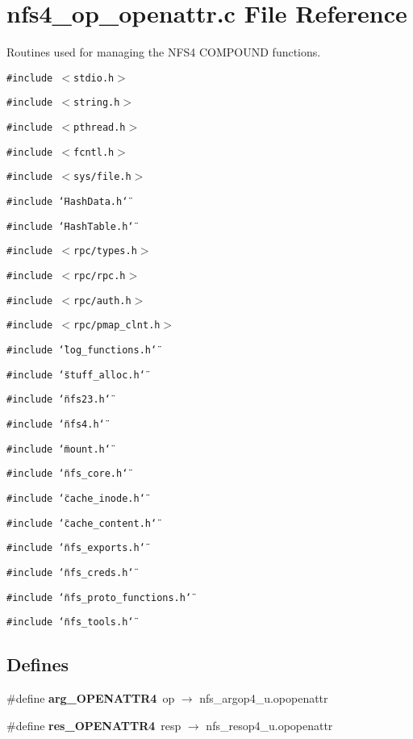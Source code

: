\section{nfs4\_\-op\_\-openattr.c File Reference}
\label{nfs4__op__openattr_8c}
Routines used for managing the NFS4 COMPOUND functions. 

{\tt \#include $<$stdio.h$>$}\par
{\tt \#include $<$string.h$>$}\par
{\tt \#include $<$pthread.h$>$}\par
{\tt \#include $<$fcntl.h$>$}\par
{\tt \#include $<$sys/file.h$>$}\par
{\tt \#include \char`\"{}Hash\-Data.h\char`\"{}}\par
{\tt \#include \char`\"{}Hash\-Table.h\char`\"{}}\par
{\tt \#include $<$rpc/types.h$>$}\par
{\tt \#include $<$rpc/rpc.h$>$}\par
{\tt \#include $<$rpc/auth.h$>$}\par
{\tt \#include $<$rpc/pmap\_\-clnt.h$>$}\par
{\tt \#include \char`\"{}log\_\-functions.h\char`\"{}}\par
{\tt \#include \char`\"{}stuff\_\-alloc.h\char`\"{}}\par
{\tt \#include \char`\"{}nfs23.h\char`\"{}}\par
{\tt \#include \char`\"{}nfs4.h\char`\"{}}\par
{\tt \#include \char`\"{}mount.h\char`\"{}}\par
{\tt \#include \char`\"{}nfs\_\-core.h\char`\"{}}\par
{\tt \#include \char`\"{}cache\_\-inode.h\char`\"{}}\par
{\tt \#include \char`\"{}cache\_\-content.h\char`\"{}}\par
{\tt \#include \char`\"{}nfs\_\-exports.h\char`\"{}}\par
{\tt \#include \char`\"{}nfs\_\-creds.h\char`\"{}}\par
{\tt \#include \char`\"{}nfs\_\-proto\_\-functions.h\char`\"{}}\par
{\tt \#include \char`\"{}nfs\_\-tools.h\char`\"{}}\par
\subsection*{Defines}
\begin{CompactItemize}
\item 
\#define {\bf arg\_\-OPENATTR4}\ op $\rightarrow$ nfs\_\-argop4\_\-u.opopenattr
\item 
\#define {\bf res\_\-OPENATTR4}\ resp $\rightarrow$ nfs\_\-resop4\_\-u.opopenattr
\end{CompactItemize}
